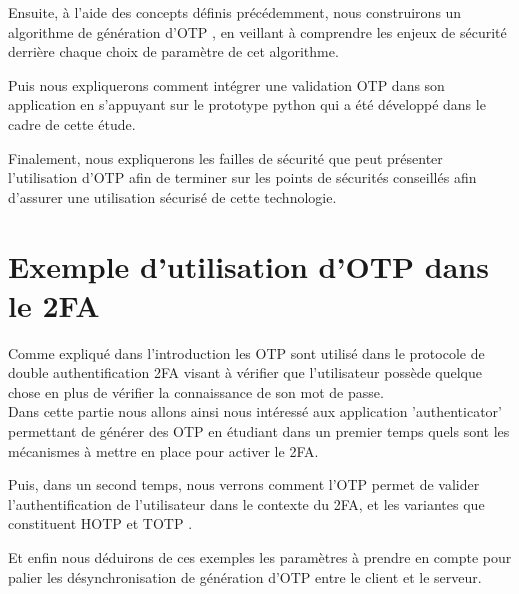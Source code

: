 \documentclass[a4paper, 10pt]{article}
\newcommand{\otp}{\textsc{OTP} }
\newcommand{\totp}{\textsc{TOTP} }
\newcommand{\hotp}{\textsc{HOTP} }
\begin{document}
    Ensuite, à l'aide des concepts définis précédemment, nous construirons un \textcolor{myblue}{algorithme de génération d'\otp} , en veillant à comprendre les \textcolor{mygreen}{enjeux de sécurité} derrière chaque \textcolor{mygreen}{choix de paramètre} de cet algorithme.

    Puis nous expliquerons comment \textcolor{myblue}{intégrer une validation \otp} dans son application en s'appuyant sur le \textcolor{mygreen}{prototype python} qui a été développé dans le cadre de cette étude.

    Finalement, nous expliquerons les \textcolor{myblue}{failles de sécurité} que peut présenter l'utilisation d'\otp afin de terminer sur les \textcolor{mygreen}{points de sécurités conseillés} afin d'assurer une utilisation sécurisé de cette technologie.\\



\newpage
    \section{Exemple d'utilisation d'\otp dans le 2FA}


    Comme expliqué dans l'introduction les \otp sont utilisé dans le \textcolor{myblue}{protocole de double authentification} 2FA visant à vérifier que \textcolor{mygreen}{l'utilisateur possède quelque chose} en plus de vérifier la connaissance de son mot de passe.\\

    Dans cette partie nous allons ainsi nous intéressé aux \textcolor{myblue}{application 'authenticator'} permettant de générer des \otp en étudiant dans un premier temps quels sont les \textcolor{mygreen}{mécanismes} à mettre en place \textcolor{mygreen}{pour activer le 2FA}. 
    
    Puis, dans un second temps, nous verrons comment l'\otp permet de \textcolor{myblue}{valider l'authentification} de l'utilisateur dans le contexte du 2FA, et \textcolor{myblue}{les variantes} que constituent \textcolor{mygreen}{\hotp} et \textcolor{mygreen}{\totp} . 
    
    Et enfin nous déduirons de ces exemples les paramètres à prendre en compte pour palier les \textcolor{myblue}{désynchronisation de génération d'\otp} entre le client et le serveur.


\end{document}
